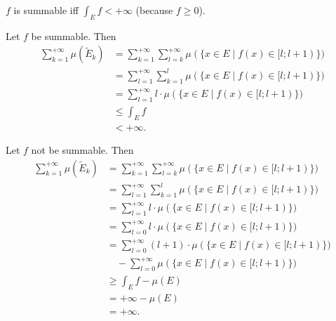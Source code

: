 \documentclass[12pt,a4paper]{article}
\begin{document}
    \begin{enumproblem}
        $f$ is summable iff $\int_E f < +\infty$ (because $f \geqslant 0$).

        Let $f$ be summable. Then
        \begin{align*}
            \sum_{k = 1}^{+\infty} \mu(\widetilde{E}_k)
            &= \sum_{k=1}^{+\infty} \sum_{l=k}^{+\infty} \mu(\{x \in E \mid f(x) \in [l;l+1)\})\\
            &= \sum_{l=1}^{+\infty} \sum_{k=1}^{l} \mu(\{x \in E \mid f(x) \in [l;l+1)\})\\
            &= \sum_{l=1}^{+\infty} l \cdot \mu(\{x \in E \mid f(x) \in [l;l+1)\})\\
            &\leqslant \int_E f\\
            &< +\infty.
        \end{align*}

        Let $f$ not be summable. Then
        \begin{align*}
            \sum_{k = 1}^{+\infty} \mu(\widetilde{E}_k)
            &= \sum_{k=1}^{+\infty} \sum_{l=k}^{+\infty} \mu(\{x \in E \mid f(x) \in [l;l+1)\})\\
            &= \sum_{l=1}^{+\infty} \sum_{k=1}^{l} \mu(\{x \in E \mid f(x) \in [l;l+1)\})\\
            &= \sum_{l=1}^{+\infty} l \cdot \mu(\{x \in E \mid f(x) \in [l;l+1)\})\\
            &= \sum_{l=0}^{+\infty} l \cdot \mu(\{x \in E \mid f(x) \in [l;l+1)\})\\
            &= \sum_{l=0}^{+\infty} (l+1) \cdot \mu(\{x \in E \mid f(x) \in [l;l+1)\})\\
            &\quad - \sum_{l=0}^{+\infty} \mu(\{x \in E \mid f(x) \in [l;l+1)\})\\
            &\geqslant \int_E f - \mu(E)\\
            &= +\infty - \mu(E)\\
            &= +\infty.
        \end{align*}
    \end{enumproblem}


\end{document}
